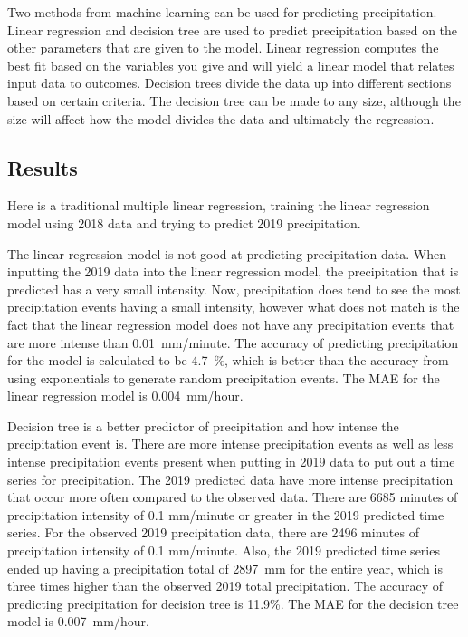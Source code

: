 \documentclass[11pt]{report}
\begin{document}
Two methods from machine learning can be used for predicting
precipitation. Linear regression and decision tree are used to predict
precipitation based on the other parameters that are given to the
model. Linear regression computes the best fit based on the variables you
give and will yield a linear model that relates input data to outcomes.
Decision trees divide the data up into different sections based on certain
criteria. The decision tree can be made to any size, although the size will 
affect how the model divides the data and ultimately the regression. 



\subsection{Results}

Here is a traditional multiple linear regression, training the linear
regression model using 2018 data and trying to predict 2019 precipitation.

The linear regression model is not good at predicting precipitation data. When inputting the 2019 data into the linear regression model, the precipitation that is predicted has a very small intensity. Now, precipitation does tend to see the most precipitation events having a small intensity, however what does not match is the fact that the linear regression model does not have any precipitation events that are more intense than 0.01~mm/minute. The accuracy of predicting precipitation for the model is calculated to be 4.7~\%, which is better than the accuracy from using exponentials to generate random precipitation events. The MAE for the linear regression model is 0.004~mm/hour.


Decision tree is a better predictor of precipitation and how intense the precipitation event is. There are more intense precipitation events as well as less intense precipitation events present when putting in 2019 data to put out a time series for precipitation. The 2019 predicted data have more intense precipitation that occur more often compared to the observed data. There are 6685 minutes of precipitation intensity of 0.1 mm/minute or greater in the 2019 predicted time series. For the observed 2019 precipitation data, there are 2496 minutes of precipitation intensity of 0.1 mm/minute. Also, the 2019 predicted time series ended up having a precipitation total of 2897~mm for the entire year, which is three times higher than the observed 2019 total precipitation. The accuracy of predicting precipitation for decision tree is 11.9\%. The MAE for the decision tree model is 0.007~mm/hour.
\end{document}
